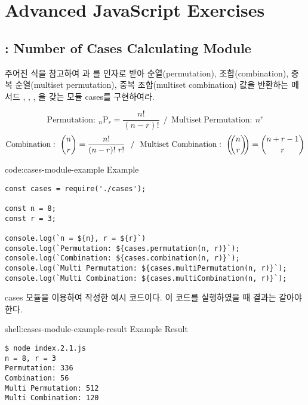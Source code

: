 \section{Advanced JavaScript Exercises}\label{sect:advanced-javascript-exercises}

\subsection*{: Number of Cases Calculating Module}

주어진 식을 참고하여 과 를 인자로 받아 순열(permutation), 조합(combination), 중복 순열(multiset permutation), 중복 조합(multiset combination) 값을 반환하는 메서드 , , , 을 갖는 모듈 cases를 구현하여라.

$$ \mathrm{Permutation}:~{}_n\mathrm{P}_r = \frac{n!}{(n-r)!}~~/~~\mathrm{Multiset~Permutation}:~n^r $$
$$ \mathrm{Combination}:~\binom{n}{r} = \frac{n!}{(n-r)!~r!}~~/~~\mathrm{Multiset~Combination}:~\left(\kern-.3em\binom{n}{r}\kern-.3em\right) = \binom{n+r-1}{r} $$

\begin{codeenv}{code:cases-module-example}{ Example}\begin{verbatim}
const cases = require('./cases');

const n = 8;
const r = 3;

console.log(`n = ${n}, r = ${r}`)
console.log(`Permutation: ${cases.permutation(n, r)}`);
console.log(`Combination: ${cases.combination(n, r)}`);
console.log(`Multi Permutation: ${cases.multiPermutation(n, r)}`);
console.log(`Multi Combination: ${cases.multiCombination(n, r)}`);
\end{verbatim}
\end{codeenv}

\은 cases 모듈을 이용하여 작성한 예시 코드이다. 이 코드를 실행하였을 때 결과는 \와 같아야 한다.

\begin{shellenv}{shell:cases-module-example-result}{ Example Result}\begin{verbatim}
$ node index.2.1.js
n = 8, r = 3
Permutation: 336
Combination: 56
Multi Permutation: 512
Multi Combination: 120
\end{verbatim}
\end{shellenv}
\clearpage

